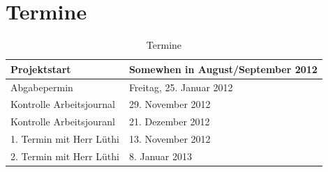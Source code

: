 \documentclass[11pt,paper=a4,final]{scrartcl}
\begin{document}
\section{Termine}
\begin{table}[h!]
  \centering
  \begin{tabular}{|l|l|}\hline
    Projektstart & Somewhen in August/September 2012 \\ \hline
    Abgabepermin & Freitag, 25. Januar 2012 \\ \hline
    Kontrolle Arbeitsjournal & 29. November 2012 \\ \hline
    Kontrolle Arbeitsjouranl & 21. Dezember 2012 \\ \hline
    1. Termin mit Herr L\"uthi & 13. November 2012 \\ \hline
    2. Termin mit Herr L\"uthi & 8. Januar 2013 \\ \hline
  \end{tabular}
  \caption{Termine}
  \label{tab:termine}
\end{table}
\end{document}
